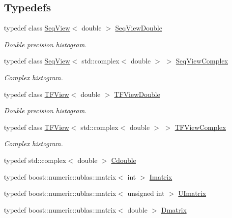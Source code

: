 \subsection*{Typedefs}
\begin{DoxyCompactItemize}
\item 
typedef class \hyperlink{classtsa_1_1_seq_view}{Seq\+View}$<$ double $>$ \hyperlink{namespacetsa_ac599574bcc094eda25613724b8f3ca9e}{Seq\+View\+Double}
\begin{DoxyCompactList}\small\item\em Double precision histogram. \end{DoxyCompactList}\item 
typedef class \hyperlink{classtsa_1_1_seq_view}{Seq\+View}$<$ std\+::complex$<$ double $>$ $>$ \hyperlink{namespacetsa_ab32775c889b53c40fa83939f22372b75}{Seq\+View\+Complex}
\begin{DoxyCompactList}\small\item\em Complex histogram. \end{DoxyCompactList}\item 
typedef class \hyperlink{classtsa_1_1_t_f_view}{T\+F\+View}$<$ double $>$ \hyperlink{namespacetsa_a0da725604861f3b1b20bbaa371e77d67}{T\+F\+View\+Double}
\begin{DoxyCompactList}\small\item\em Double precision histogram. \end{DoxyCompactList}\item 
typedef class \hyperlink{classtsa_1_1_t_f_view}{T\+F\+View}$<$ std\+::complex$<$ double $>$ $>$ \hyperlink{namespacetsa_ac27fece838548b661b9d7b73f36b61d5}{T\+F\+View\+Complex}
\begin{DoxyCompactList}\small\item\em Complex histogram. \end{DoxyCompactList}\item 
typedef std\+::complex$<$ double $>$ \hyperlink{namespacetsa_a7b1f40fa90474b78dd0ab472b7c37547}{Cdouble}
\item 
typedef boost\+::numeric\+::ublas\+::matrix$<$ int $>$ \hyperlink{namespacetsa_aad3ff4a1af568c2cf9258474cecb868f}{Imatrix}
\item 
typedef boost\+::numeric\+::ublas\+::matrix$<$ unsigned int $>$ \hyperlink{namespacetsa_ad9cc6c0ebe447f2d49102804a7d7a6f6}{U\+Imatrix}
\item 
typedef boost\+::numeric\+::ublas\+::matrix$<$ double $>$ \hyperlink{namespacetsa_ad260cd21c1891c4ed391fe788569aba4}{Dmatrix}
\item 

\end{DoxyCompactItemize}
